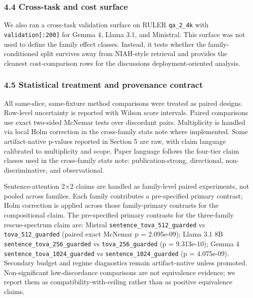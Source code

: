 \documentclass[
]{article}
\begin{document}
\subsubsection{4.4 Cross-task and cost
surface}\label{44-cross-task-and-cost-surface}

We also ran a cross-task validation surface on RULER \texttt{qa\_2\_4k}
with \texttt{validation{[}:200{]}} for Gemma 4, Llama 3.1, and Ministral.
This surface was not used to define the family effect classes.
Instead, it tests whether the family-conditioned split survives away
from NIAH-style retrieval and provides the cleanest cost-comparison rows
for the discussion\textquotesingle s deployment-oriented analysis.

\subsubsection{4.5 Statistical treatment and provenance
contract}\label{45-statistical-treatment-and-provenance-contract}

All same-slice, same-fixture method comparisons were treated as paired
designs. Row-level uncertainty is reported with Wilson score intervals.
Paired comparisons use exact two-sided McNemar tests over discordant
pairs. Multiplicity is handled via local Holm correction in the
cross-family stats note where implemented. Some artifact-native p-values
reported in Section 5 are raw, with claim language calibrated to
multiplicity and scope. Paper language follows the four-tier claim
classes used in the cross-family stats note: publication-strong,
directional, non-discriminative, and observational.

Sentence-attention 2×2 claims are handled as family-level paired
experiments, not pooled across families. Each family contributes a
pre-specified primary contrast; Holm correction is applied across those
family-primary contrasts for the compositional claim. The pre-specified
primary contrasts for the three-family rescue-spectrum claim are:
Mistral \texttt{sentence\_tova\_512\_guarded} vs
\texttt{tova\_512\_guarded} (paired exact McNemar p = 2.095e-09); Llama
3.1 8B \texttt{sentence\_tova\_256\_guarded} vs
\texttt{tova\_256\_guarded} (p = 9.313e-10); Gemma 4
\texttt{sentence\_tova\_1024\_guarded} vs
\texttt{sentence\_1024\_guarded} (p = 4.075e-09). Secondary budget and
regime diagnostics remain artifact-native unless promoted.
Non-significant low-discordance comparisons are not equivalence
evidence; we report them as compatibility-with-ceiling rather than as
positive equivalence claims.
\end{document}
